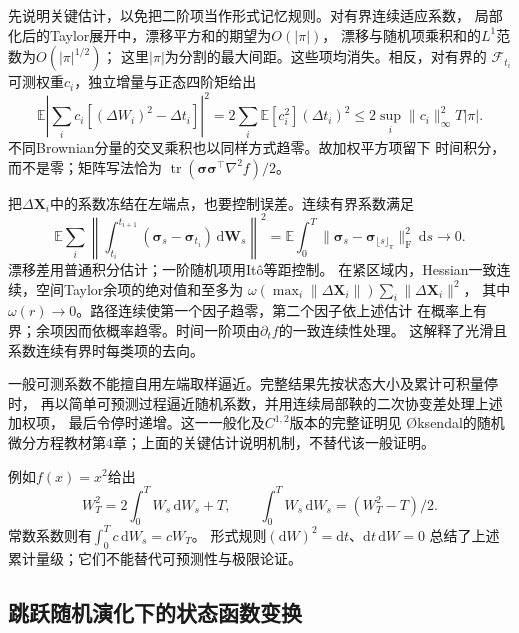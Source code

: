 先说明关键估计，以免把二阶项当作形式记忆规则。对有界连续适应系数，
局部化后的Taylor展开中，漂移平方和的期望为$O(|\pi|)$，
漂移与随机项乘积和的$L^1$范数为$O(|\pi|^{1/2})$；
这里$|\pi|$为分割的最大间距。这些项均消失。相反，对有界的
$\mathcal F_{t_i}$可测权重$c_i$，独立增量与正态四阶矩给出
\[
 \mathbb E\left|\sum_i c_i[(\Delta W_i)^2-\Delta t_i]\right|^2
   =2\sum_i\mathbb E[c_i^2](\Delta t_i)^2
   \leq2\sup_i\|c_i\|_\infty^2T|\pi|.
\]
不同Brownian分量的交叉乘积也以同样方式趋零。故加权平方项留下
时间积分，而不是零；矩阵写法恰为
$\operatorname{tr}(\bm\sigma\bm\sigma^\top\nabla^2f)/2$。

把$\Delta\bm X_i$中的系数冻结在左端点，也要控制误差。连续有界系数满足
\[
 \mathbb E\sum_i
 \left\|\int_{t_i}^{t_{i+1}}
    (\bm\sigma_s-\bm\sigma_{t_i})\,\mathrm d\bm W_s\right\|^2
 =\mathbb E\int_0^T
       \|\bm\sigma_s-\bm\sigma_{\lfloor s\rfloor_\pi}\|_{\mathrm F}^2\,\mathrm ds
 \longrightarrow0.
\]
漂移差用普通积分估计；一阶随机项用Itô等距控制。
在紧区域内，Hessian一致连续，空间Taylor余项的绝对值和至多为
$\omega(\max_i\|\Delta\bm X_i\|)\sum_i\|\Delta\bm X_i\|^2$，
其中$\omega(r)\to0$。路径连续使第一个因子趋零，第二个因子依上述估计
在概率上有界；余项因而依概率趋零。时间一阶项由$\partial_t f$的一致连续性处理。
这解释了光滑且系数连续有界时每类项的去向。

一般可测系数不能擅自用左端取样逼近。完整结果先按状态大小及累计可积量停时，
再以简单可预测过程逼近随机系数，并用连续局部鞅的二次协变差处理上述加权项，
最后令停时递增。这一一般化及$C^{1,2}$版本的完整证明见
Øksendal的随机微分方程教材第4章；上面的关键估计说明机制，不替代该一般证明。

例如$f(x)=x^2$给出
\[
  W_T^2=2\int_0^T W_s\,\mathrm dW_s+T,\qquad
  \int_0^T W_s\,\mathrm dW_s=(W_T^2-T)/2.
\]
常数系数则有$\int_0^T c\,\mathrm dW_s=cW_T$。
形式规则$(\mathrm dW)^2=\mathrm dt$、$\mathrm dt\,\mathrm dW=0$
总结了上述累计量级；它们不能替代可预测性与极限论证。

\subsection{跳跃随机演化下的状态函数变换}
\label{sec:action-state-jump-ito}

